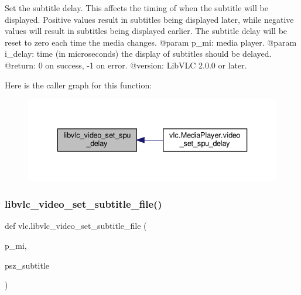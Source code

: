 \begin{DoxyVerb}Set the subtitle delay. This affects the timing of when the subtitle will
be displayed. Positive values result in subtitles being displayed later,
while negative values will result in subtitles being displayed earlier.
The subtitle delay will be reset to zero each time the media changes.
@param p_mi: media player.
@param i_delay: time (in microseconds) the display of subtitles should be delayed.
@return: 0 on success, -1 on error.
@version: LibVLC 2.0.0 or later.
\end{DoxyVerb}
 Here is the caller graph for this function\+:
\nopagebreak
\begin{figure}[H]
\begin{center}
\leavevmode
\includegraphics[width=336pt]{namespacevlc_aef6c3b516812532dbf6a1b52e3e0a9db_icgraph}
\end{center}
\end{figure}
\mbox{\label{namespacevlc_a51adbf5641c80acf9c96eb0a6395157b}} 
\subsubsection{\texorpdfstring{libvlc\+\_\+video\+\_\+set\+\_\+subtitle\+\_\+file()}{libvlc\_video\_set\_subtitle\_file()}}
{\footnotesize\ttfamily def vlc.\+libvlc\+\_\+video\+\_\+set\+\_\+subtitle\+\_\+file (\begin{DoxyParamCaption}\item[{}]{p\+\_\+mi,  }\item[{}]{psz\+\_\+subtitle }\end{DoxyParamCaption})}

